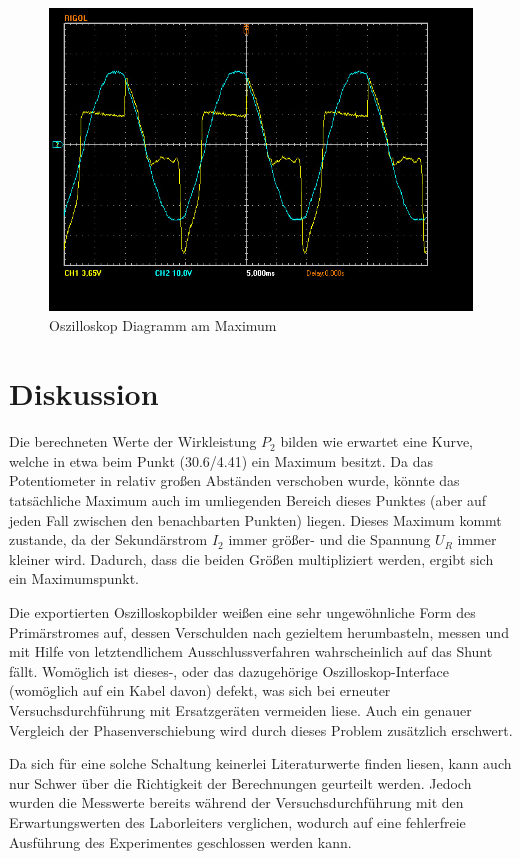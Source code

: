\documentclass[12pt,a4paper,twoside]{article}
\begin{document}
\begin{figure}[H]
    \centering
    \includegraphics[width=0.6\linewidth, angle=0]{nudes/A3 Oszi Pmax.jpg}
    \caption{Oszilloskop Diagramm am Maximum}
    \label{fig:OszilloskopDiagrammMax}
\end{figure}



\section{Diskussion} %

Die berechneten Werte der Wirkleistung $P_{2}$ bilden wie erwartet eine Kurve, welche in etwa beim Punkt (30.6/4.41) ein Maximum besitzt. Da das Potentiometer in relativ großen Abständen verschoben wurde, könnte das tatsächliche Maximum auch im umliegenden Bereich dieses Punktes (aber auf jeden Fall zwischen den benachbarten Punkten) liegen.
Dieses Maximum kommt zustande, da der Sekundärstrom $I_{2}$ immer größer- und die Spannung $U_{R}$ immer kleiner wird. Dadurch, dass die beiden Größen multipliziert werden, ergibt sich ein Maximumspunkt. \newline

\noindent
Die exportierten Oszilloskopbilder weißen eine sehr ungewöhnliche Form des Primärstromes auf, dessen Verschulden nach gezieltem herumbasteln, messen und mit Hilfe von letztendlichem Ausschlussverfahren wahrscheinlich auf das Shunt fällt. Womöglich ist dieses-, oder das dazugehörige Oszilloskop-Interface (womöglich auf ein Kabel davon) defekt, was sich bei erneuter Versuchsdurchführung mit Ersatzgeräten vermeiden liese. Auch ein genauer Vergleich der Phasenverschiebung wird durch dieses Problem zusätzlich erschwert. \newline

\noindent
Da sich für eine solche Schaltung keinerlei Literaturwerte finden liesen, kann auch nur Schwer über die Richtigkeit der Berechnungen geurteilt werden. Jedoch wurden die Messwerte bereits während der Versuchsdurchführung mit den Erwartungswerten des Laborleiters verglichen, wodurch auf eine fehlerfreie Ausführung des Experimentes geschlossen werden kann.
\end{document}
